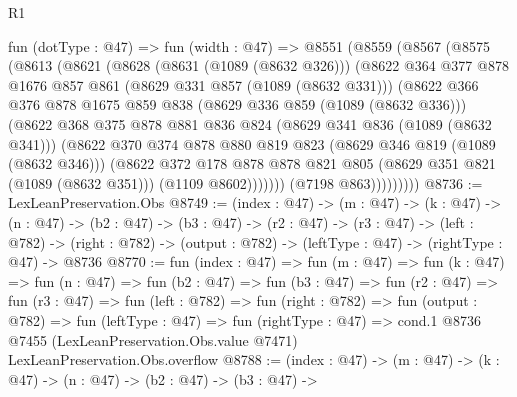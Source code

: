 \begin{lexlean}{R1}
\begin{coremodule}
        fun (dotType : @47) =>
        fun (width : @47) =>
        @8551
          (@8559
            (@8567
              (@8575
                (@8613
                  (@8621
                    (@8628
                      (@8631 (@1089 (@8632 @326)))
                      (@8622
                        @364
                        @377
                        @878
                        @1676
                        @857
                        @861
                        (@8629 @331 @857 (@1089 (@8632 @331)))
                        (@8622
                          @366
                          @376
                          @878
                          @1675
                          @859
                          @838
                          (@8629 @336 @859 (@1089 (@8632 @336)))
                          (@8622
                            @368
                            @375
                            @878
                            @881
                            @836
                            @824
                            (@8629 @341 @836 (@1089 (@8632 @341)))
                            (@8622
                              @370
                              @374
                              @878
                              @880
                              @819
                              @823
                              (@8629 @346 @819 (@1089 (@8632 @346)))
                              (@8622
                                @372
                                @178
                                @878
                                @878
                                @821
                                @805
                                (@8629 @351 @821 (@1089 (@8632 @351)))
                                (@1109 @8602)))))))
                    (@7198 @863)))))))))
@8736 := LexLeanPreservation.Obs
@8749 := (index : @47) ->
  (m : @47) ->
  (k : @47) ->
  (n : @47) ->
  (b2 : @47) ->
  (b3 : @47) ->
  (r2 : @47) ->
  (r3 : @47) ->
  (left : @782) ->
  (right : @782) -> (output : @782) -> (leftType : @47) -> (rightType : @47) -> @8736
@8770 := fun (index : @47) =>
  fun (m : @47) =>
  fun (k : @47) =>
  fun (n : @47) =>
  fun (b2 : @47) =>
  fun (b3 : @47) =>
  fun (r2 : @47) =>
  fun (r3 : @47) =>
  fun (left : @782) =>
  fun (right : @782) =>
  fun (output : @782) =>
  fun (leftType : @47) =>
  fun (rightType : @47) =>
  cond.{1} @8736 @7455 (LexLeanPreservation.Obs.value @7471) LexLeanPreservation.Obs.overflow
@8788 := (index : @47) ->
  (m : @47) ->
  (k : @47) ->
  (n : @47) ->
  (b2 : @47) ->
  (b3 : @47) ->

\end{coremodule}
\end{lexlean}
